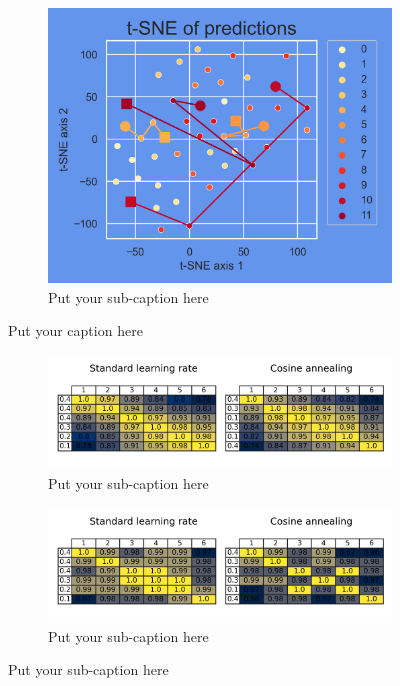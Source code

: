 \begin{figure}[ht]
\begin{subfigure}{.5\textwidth}
		\includegraphics[width=.9\linewidth]{./figs/preds_tSNE_2.png}  
		\caption{Put your sub-caption here}
		\label{fig:sub-second}
	\end{subfigure}
	\caption{Put your caption here}
	\label{fig:fig}
\end{figure}

\blindtext

\begin{figure}[ht]
	\begin{subfigure}{1\textwidth}
		\centering
		\includegraphics[width=1\linewidth]{./figs/params_cosine_similarities.png}  
		\caption{Put your sub-caption here}
		\label{fig:sub-first}
	\end{subfigure}
	\begin{subfigure}{1\textwidth}
		\centering
		\includegraphics[width=1\linewidth]{./figs/preds_cosine_similarities.png}  
		\caption{Put your sub-caption here}
		\label{fig:sub-second}
	\end{subfigure}	
\end{figure}




	
\printbibliography[heading=bibintoc,title={References}]
	
